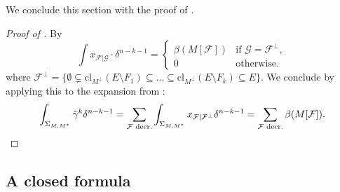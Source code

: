 \documentclass[12pt,a4paper,english]{scrartcl}
\begin{document}
We conclude this section with the proof of .

\begin{proof}[Proof of ]
By \cite[Lemma 4.15 and Proposition 4.18]{Ardila2022}
\[
\int x_{\mathcal{F}|\mathcal{G}} \cdot \delta^{n-k-1} = \begin{cases}
\beta(M[\mathcal{F}]) & \text{if }\mathcal{G} = \mathcal{F}^\perp, \\
0 & \text{otherwise}.
\end{cases}
\]
where $\mathcal{F}^\perp=\{\emptyset \subsetneq \text{cl}_{M^\perp}(E\setminus F_1)\subseteq \dots \subseteq \text{cl}_{M^\perp}(E\setminus F_k)\subseteq E\}$. 
We conclude by applying this to the expansion from :
\[
\int_{\Sigma_{M,M^*}} \tilde{\gamma}^k \delta^{n-k-1} = \sum_{\mathcal{F}\text{ decr.}} \int_{\Sigma_{M,M^*}} x_{\mathcal{F}|\mathcal{F}^\perp}\delta^{n-k-1} = \sum_{\mathcal{F}\text{ decr.}} \beta(M[\mathcal{F}]).\qedhere
\]
\end{proof}

\subsection{A closed formula} \label{sec:running}
\end{document}
